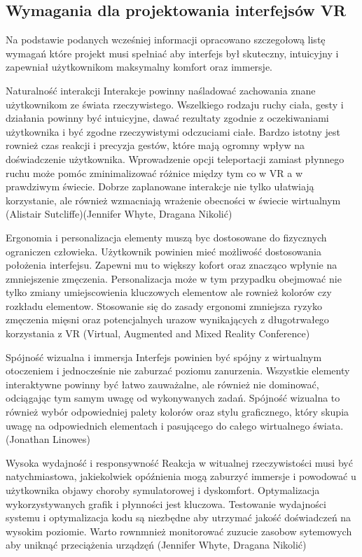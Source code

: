 \subsection{Wymagania dla projektowania interfejsów VR}

Na podstawie podanych wcześniej informacji opracowano szczegołową listę wymagań które projekt musi spełniać aby interfejs był skuteczny, intuicyjny i zapewniał użytkownikom maksymalny komfort oraz immersje. 

Naturalność interakcji
Interakcje powinny naśladować  zachowania znane użytkownikom ze świata rzeczywistego. Wszelkiego rodzaju ruchy ciała, gesty i działania powinny być intuicyjne, dawać rezultaty zgodnie z oczekiwaniami użytkownika i być zgodne rzeczywistymi odczuciami ciałe. Bardzo istotny jest rownież czas reakcji i precyzja gestów, które mają ogromny wpływ na doświadczenie użytkownika. Wprowadzenie opcji teleportacji zamiast płynnego ruchu może pomóc zminimalizować różnice między tym co w VR a w prawdziwym świecie. Dobrze zaplanowane interakcje nie tylko ułatwiają korzystanie, ale również wzmacniają wrażenie obecności w świecie wirtualnym (Alistair Sutcliffe)(Jennifer Whyte, Dragana Nikolić)

Ergonomia i personalizacja
elementy muszą byc dostosowane do fizycznych ograniczen człowieka. Użytkownik powinien mieć możliwość dostosowania położenia interfejsu. Zapewni mu to większy kofort oraz znacząco wpłynie na zmniejszenie zmęczenia. Personalizacja może w tym przypadku obejmować nie tylko zmiany umiejscowienia kluczowych elementow ale rownież kolorów czy rozkładu elementow. Stosowanie się do zasady ergonomi zmniejsza ryzyko zmęczenia mięsni oraz potencjalnych urazow wynikających z długotrwałego korzystania z VR (Virtual, Augmented and Mixed Reality Conference)

Spójność wizualna i immersja
Interfejs powinien być spójny z wirtualnym otoczeniem i jednocześnie nie zaburzać poziomu zanurzenia. Wszystkie elementy interaktywne powinny być łatwo zauważalne, ale również nie dominować, odciągając tym samym uwagę od wykonywanych zadań.
Spójność wizualna to również wybór odpowiedniej palety kolorów oraz stylu graficznego, który skupia uwagę na odpowiednich elementach i pasującego do całego wirtualnego świata.
(Jonathan Linowes)

Wysoka wydajność i responsywność
Reakcja w witualnej rzeczywistości musi być natychmiastowa, jakiekolwiek opóźnienia mogą zaburzyć immersje i powodować u użytkownika objawy choroby symulatorowej i dyskomfort. Optymalizacja wykorzystywanych grafik i płynności jest kluczowa. Testowanie wydajności systemu i optymalizacja kodu są niezbędne aby  utrzymać jakość doświadczeń na wysokim poziomie. Warto rownmnież monitorować zuzucie zasobow sytemowych aby uniknąć przeciążenia urządzęń (Jennifer Whyte, Dragana Nikolić)

